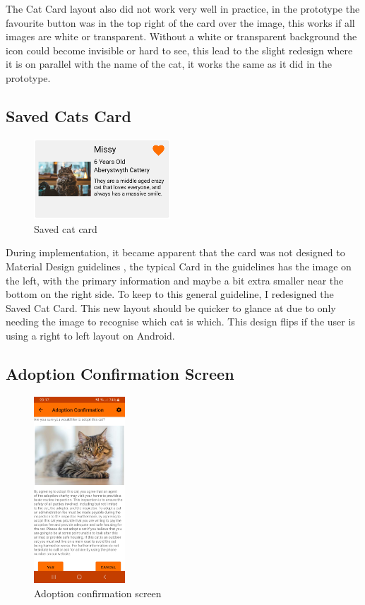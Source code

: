 The Cat \gls{Card} layout also did not work very well in practice, in the prototype the favourite button was in the top right of the card over the image, this works if all images are white or transparent. Without a white or transparent background the icon could become invisible or hard to see, this lead to the slight redesign where it is on parallel with the name of the cat, it works the same as it did in the prototype.

\subsection{Saved Cats Card}

\begin{figure} [htbp!]
    \centering
    \includegraphics[height=3cm]{Images/SavedCatCard.png}
    \caption{Saved cat card}
    \label{fig:saved_cat_card}
\end{figure}

During implementation, it became apparent that the card was not designed to Material Design guidelines \cite{MATERIALDESIGNGUIDELINES}, the typical \gls{Card} in the guidelines has the image on the left, with the primary information and maybe a bit extra smaller near the bottom on the right side. To keep to this general guideline, I redesigned the Saved Cat \gls{Card}. This new layout should be quicker to glance at due to only needing the image to recognise which cat is which. This design flips if the user is using a right to left layout on Android.

\subsection{Adoption Confirmation Screen}

\begin{figure} [htbp!]
    \centering
    \includegraphics[height=7cm]{Images/AdoptionConfirmationScreen.jpg}
    \caption{Adoption confirmation screen}
    \label{fig:adoption_confirmation_screen}
\end{figure}

